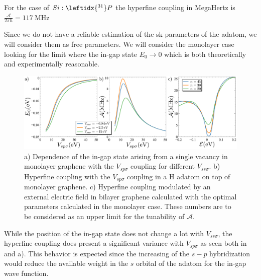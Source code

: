 For the case of $Si:\leftidx{^{31}}P$ the hyperfine coupling in MegaHertz is\cite{Dehollain2014,Kalra2014}
$\frac{\mathcal{A}}{2\pi\hbar} = \SI{117}{\MHz}$


Since we do not have a reliable estimation of the \ac{sk} parameters of the adatom, we will consider them as free parameters.
We will consider the monolayer case looking for the limit where the in-gap state $E_0\to0$ which is both theoretically and experimentally reasonable.\cite{Soriano2010,Ao2011,Balakrishnan2013,Gmitra2013,Brihuega2016}

\begin{figure}[h!]
\centering
\includegraphics{defects/fig/coupling_hyper1.pdf}
\vspace{-10pt}
\caption{a) Dependence of the in-gap state arising from a single vacancy in monolayer graphene with the $V_{sp\sigma}$ coupling for different $V_{ss\sigma}$. b) Hyperfine coupling with the $V_{sp\sigma}$ coupling in a H adatom on top of monolayer graphene. c) Hyperfine coupling modulated by an external electric field in bilayer graphene calculated with the optimal parameters calculated in the monolayer case. These numbers are to be considered as an upper limit for the tunability of $\mathcal{A}$.}
\label{hyperfine}
\end{figure}

While the position of the in-gap state does not change a lot with $V_{ss\sigma}$, the hyperfine coupling does present a significant variance with $V_{sp\sigma}$ as seen both in  and a). This behavior is expected since the increasing of the $s-p$ hybridization would reduce the available weight in the $s$ orbital of the adatom for the in-gap wave function.


